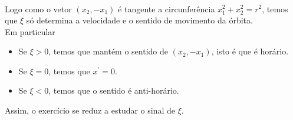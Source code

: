 \begin{homeworkProblem}[1-20]
\begin{solution}
\begin{enumerate}
\begin{align*}
      \end{align*}
      Logo como o vetor $(x_2,-x_1)$ é tangente a circunferência $x_1^2+x_2^2=r^2$, temos que $\xi$ só determina a velocidade e o sentido de movimento da órbita.\\
      Em particular
      \begin{itemize}
        \item Se $\xi>0$, temos que mantém o sentido de $(x_2,-x_1)$, isto é que é horário.
        \item Se $\xi=0$, temos que $x^{\prime}=0$.
        \item Se $\xi<0$, temos que o sentido é anti-horário.
      \end{itemize}
      Assim, o exercício se reduz a estudar o sinal de $\xi$.
  \end{enumerate}
  \end{solution}
\end{homeworkProblem}
